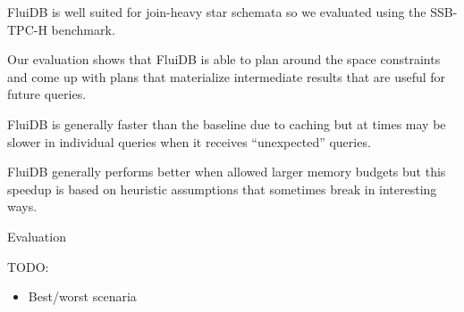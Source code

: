 
\begin{summary}
\item FluiDB is well suited for join-heavy star schemata so we
  evaluated using the SSB-TPC-H benchmark.
\item Our evaluation shows that FluiDB is able to plan around the
  space constraints and come up with plans that materialize
  intermediate results that are useful for future queries.
\item FluiDB is generally faster than the baseline due to caching but
  at times may be slower in individual queries when it receives
  ``unexpected'' queries.
\item FluiDB generally performs better when allowed larger memory
  budgets but this speedup is based on heuristic assumptions that
  sometimes break in interesting ways.
\end{summary}

\begin{contribution}{Evaluation}

  TODO:
  \begin{itemize}
  \item Best/worst scenaria
  \end{itemize}

\end{contribution}

